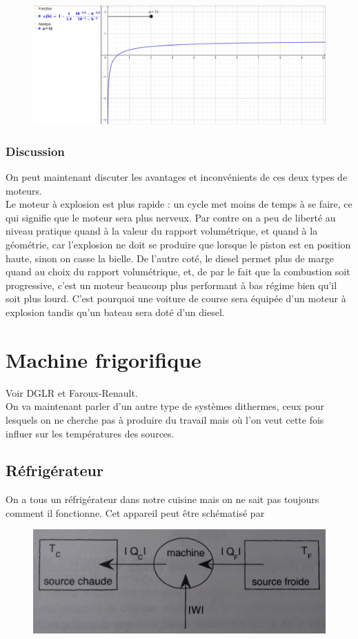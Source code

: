 \documentclass[12pt,prb,aps,epsf]{report}
\begin{document}
\begin{figure}[h]
	\centerline {\includegraphics[width=15cm]{rendement_diesel}}
\end{figure} 

\subsubsection{Discussion}
On peut maintenant discuter les avantages et inconvénients de ces deux types de moteurs.\\

Le moteur à explosion est plus rapide : un cycle met moins de temps à se faire, ce qui signifie que le moteur sera plus nerveux. Par contre on a peu de liberté au niveau pratique quand à la valeur du rapport volumétrique, et quand à la géométrie, car l'explosion ne doit se produire que lorsque le piston est en position haute, sinon on casse la bielle. De l'autre coté, le diesel permet plus de marge quand au choix du rapport volumétrique, et, de par le fait que la combustion soit progressive, c'est un moteur beaucoup plus performant à bas régime bien qu'il soit plus lourd. C'est pourquoi une voiture de course sera équipée d'un moteur à explosion tandis qu'un bateau sera doté d'un diesel.

\section{Machine frigorifique}
Voir DGLR et Faroux-Renault.\\
 On va maintenant parler d'un autre type de systèmes dithermes, ceux pour lesquels on ne cherche pas à produire du travail mais où l'on veut cette fois influer sur les températures des sources.
\subsection{Réfrigérateur}
On a tous un réfrigérateur dans notre cuisine mais on ne sait pas toujours comment il fonctionne. Cet appareil peut être schématisé par \\
\begin{figure}
	\centerline {\includegraphics[width=\linewidth=10cm]{machine_frigorifique}}
\end{figure}
\end{document}
